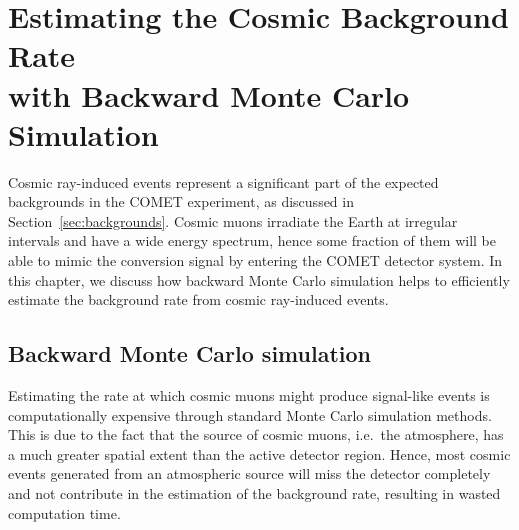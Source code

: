\chapter[Estimating the Cosmic Background Rate with Backward Monte Carlo
Simulation]{Estimating the Cosmic Background Rate \\with Backward Monte Carlo
Simulation}\label{ch:cosmics}








Cosmic ray-induced events represent a significant part of the expected
backgrounds in the COMET experiment, as discussed in
Section~\ref{sec:backgrounds}. Cosmic muons irradiate the Earth at irregular
intervals and have a wide energy spectrum, hence some fraction of them will be
able to mimic the conversion signal by entering the COMET detector system. In
this chapter, we discuss how backward Monte Carlo simulation helps to
efficiently estimate the background rate from cosmic ray-induced events.

\section{Backward Monte Carlo simulation}

Estimating the rate at which cosmic muons might produce signal-like events is
computationally expensive through standard Monte Carlo simulation methods. This
is due to the fact that the source of cosmic muons, i.e.\ the atmosphere, has a
much greater spatial extent than the active detector region. Hence, most cosmic
events generated from an atmospheric source will miss the detector completely
and not contribute in the estimation of the background rate, resulting in wasted
computation time.


